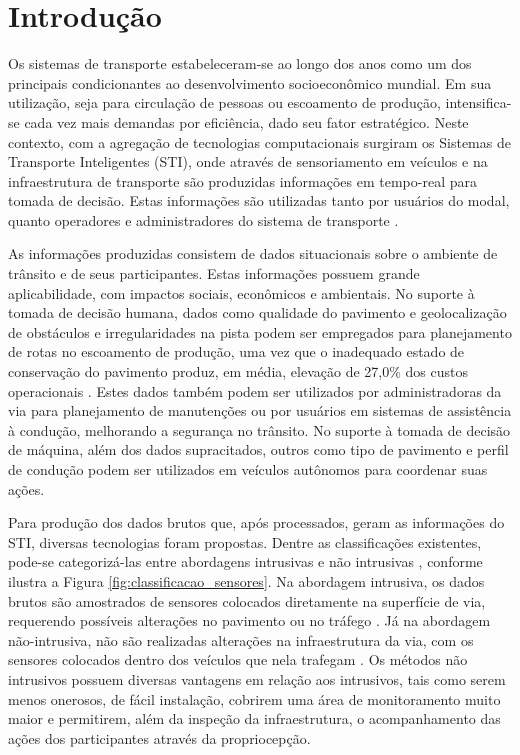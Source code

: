\chapter{Introdução}
\label{cap:introducao}

Os sistemas de transporte estabeleceram-se ao longo dos anos como um dos principais condicionantes ao desenvolvimento socioeconômico mundial. Em sua utilização, seja para circulação de pessoas ou escoamento de produção, intensifica-se cada vez mais demandas por eficiência, dado seu fator estratégico. Neste contexto, com a agregação de tecnologias computacionais surgiram os Sistemas de Transporte Inteligentes (STI), onde através de sensoriamento em veículos e na infraestrutura de transporte são produzidas informações em tempo-real para tomada de decisão. Estas informações são utilizadas tanto por usuários do modal, quanto operadores e administradores do sistema de transporte \cite{NI2016}.

As informações produzidas consistem de dados situacionais sobre o ambiente de trânsito e de seus participantes. Estas informações possuem grande aplicabilidade, com impactos sociais, econômicos e ambientais. No suporte à tomada de decisão humana, dados como qualidade do pavimento e geolocalização de obstáculos e irregularidades na pista podem ser empregados para planejamento de rotas no escoamento de produção, uma vez que o inadequado estado de conservação do pavimento produz, em média, elevação de 27,0\% dos custos operacionais \cite{CNT2017}. Estes dados também podem ser utilizados por administradoras da via para planejamento de manutenções ou por usuários em sistemas de assistência à condução, melhorando a segurança no trânsito. No suporte à tomada de decisão de máquina, além dos dados supracitados, outros como tipo de pavimento e perfil de condução podem ser utilizados em veículos autônomos para coordenar suas ações.

Para produção dos dados brutos que, após processados, geram as informações do STI, diversas tecnologias foram propostas. Dentre as classificações existentes, pode-se categorizá-las entre abordagens intrusivas e não intrusivas \cite{NI2016}, conforme ilustra a Figura \ref{fig:classificacao_sensores}. Na abordagem intrusiva, os dados brutos são amostrados de sensores colocados diretamente na superfície de via, requerendo possíveis alterações no pavimento ou no tráfego \cite{mathew2014a}. Já na abordagem não-intrusiva, não são realizadas alterações na infraestrutura da via, com os sensores colocados dentro dos veículos que nela trafegam \cite{mathew2014b}. Os métodos não intrusivos possuem diversas vantagens em relação aos intrusivos, tais como serem menos onerosos, de fácil instalação, cobrirem uma área de monitoramento muito maior e permitirem, além da inspeção da infraestrutura, o acompanhamento das ações dos participantes através da propriocepção.

